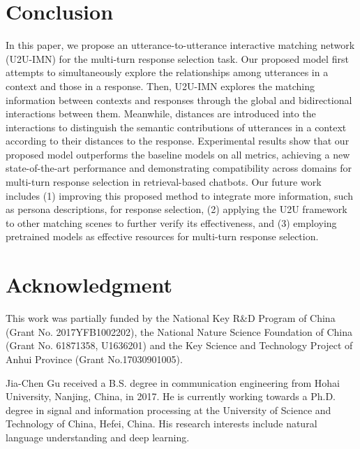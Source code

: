 \documentclass[journal]{IEEEtran}
\begin{document}
\section{Conclusion}
  In this paper, we propose an utterance-to-utterance interactive matching network (U2U-IMN) for the multi-turn response selection task. Our proposed model first attempts to simultaneously explore the relationships among utterances in a context and those in a response. Then, U2U-IMN explores the matching information between contexts and responses through the global and bidirectional interactions between them. Meanwhile, distances are introduced into the interactions to distinguish the semantic contributions of utterances in a context according to their distances to the response. Experimental results show that our proposed model outperforms the baseline models on all metrics, achieving a new state-of-the-art performance and demonstrating compatibility across domains for multi-turn response selection in retrieval-based chatbots.
  Our future work includes
  (1) improving this proposed method to integrate more information, such as persona descriptions, for response selection,
  (2) applying the U2U framework to other matching scenes to further verify its effectiveness, and
  (3) employing pretrained models as effective resources for multi-turn response selection.


\section*{Acknowledgment}
  This work was partially funded by the National Key R\&D Program of China (Grant No. 2017YFB1002202), the National Nature Science Foundation of China (Grant No. 61871358, U1636201) and the Key Science and Technology Project of Anhui Province (Grant No.17030901005).














\ifCLASSOPTIONcaptionsoff
  \newpage
\fi





\begin{IEEEbiography}{Jia-Chen Gu}
  received a B.S. degree in communication engineering from Hohai University, Nanjing, China, in 2017. He is currently working towards a Ph.D. degree in signal and information processing at the University of Science and Technology of China, Hefei, China. His research interests include natural language understanding and deep learning.
\end{IEEEbiography}
\end{document}
